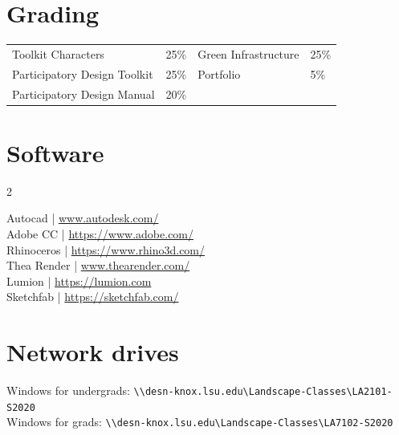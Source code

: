 \documentclass[11pt,article,oneside]{memoir}
\begin{document}

\section{Grading}

\begin{table}[H]
\begin{tabular}{l r @{\hskip 2cm} l @{\hskip 0.5cm} l}

Toolkit Characters & 25\% & Green Infrastructure & 25\% \\
Participatory Design Toolkit & 25\% & Portfolio & 5\% \\
Participatory Design Manual & 20\%\\
\end{tabular}
\end{table}

\clearpage

\section{Software}
\begin{multicols}{2}
\raggedright
Autocad | \url{www.autodesk.com/‎}\\
Adobe CC | \url{https://www.adobe.com/}\\
Rhinoceros | \url{https://www.rhino3d.com/}\\
Thea Render | \url{www.thearender.com/}\\
Lumion | \url{https://lumion.com}\\
Sketchfab | \url{https://sketchfab.com/}\\
\end{multicols}

\section{Network drives}


\noindent
Windows for undergrads: \verb|\\desn-knox.lsu.edu\Landscape-Classes\LA2101-S2020| \\
Windows for grads: \verb|\\desn-knox.lsu.edu\Landscape-Classes\LA7102-S2020| \\
\end{document}
